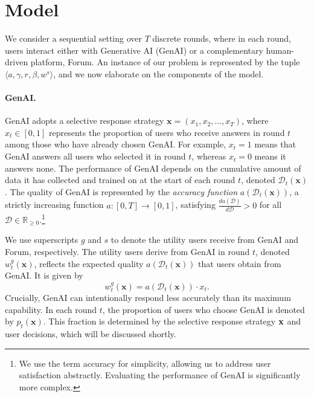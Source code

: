 \section{Model} \label{sec: model}
We consider a sequential setting over \( T \) discrete rounds, where in each round, users interact either with Generative AI (GenAI) or a complementary human-driven platform, Forum. An instance of our problem is represented by the tuple \( \langle a, \gamma, r, \beta, w^s \rangle \), and we now elaborate on the components of the model.

\paragraph{GenAI.}  
GenAI adopts a selective response strategy $\mathbf{x} = (x_1, x_2, \ldots, x_T)$, where $x_t \in [0, 1]$ represents the proportion of users who receive answers in round $t$ among those who have already chosen GenAI. For example, $x_t = 1$ means that GenAI answers all users who selected it in round $t$, whereas $x_t = 0$ means it answers none. The performance of GenAI depends on the cumulative amount of data it has collected and trained on at the start of each round $t$, denoted $\mathcal{D}_t(\mathbf{x})$. The quality of GenAI is represented by the \emph{accuracy function} $a(\mathcal{D}_t(\mathbf{x}))$, a strictly increasing function $a : [0, T] \to [0, 1]$, satisfying $\frac{d a(\mathcal{D})}{d \mathcal{D}} > 0$ for all $\mathcal{D} \in \mathbb{R}_{\geq 0}$.\footnote{We use the term accuracy for simplicity, allowing us to address user satisfaction abstractly. Evaluating the performance of GenAI is significantly more complex.}   

We use superscripts $g$ and $s$ to denote the utility users receive from GenAI and Forum, respectively. The utility users derive from GenAI in round $t$, denoted $w^g_t(\mathbf{x})$, reflects the expected quality $a(\mathcal{D}_t(\mathbf{x}))$ that users obtain from GenAI. It is given by  
\begin{equation}\label{eqdef wg}
w^g_t(\mathbf{x}) = a(\mathcal{D}_t(\mathbf{x})) \cdot x_t.    
\end{equation}
Crucially, GenAI can intentionally respond less accurately than its maximum capability. In each round $t$, the proportion of users who choose GenAI is denoted by $p_t(\mathbf{x})$. This fraction is determined by the selective response strategy ${\bf{x}}$ and user decisions, which will be discussed shortly.

